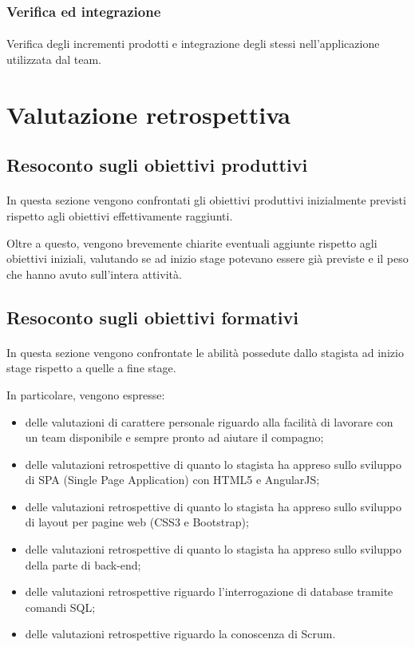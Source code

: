 \documentclass[
article,
10pt, %
oneside, %
BCOR5mm, %
]{scrartcl}
\begin{document}
\subsubsection{Verifica ed integrazione}
\paragraph{} Verifica degli incrementi prodotti e integrazione degli stessi
nell'applicazione utilizzata dal team.



\section{Valutazione retrospettiva} %

\subsection{Resoconto sugli obiettivi produttivi}
\paragraph{} In questa sezione vengono confrontati gli obiettivi produttivi
inizialmente previsti rispetto agli obiettivi effettivamente raggiunti.

Oltre a questo, vengono brevemente chiarite eventuali aggiunte rispetto agli
obiettivi iniziali, valutando se ad inizio stage potevano essere già previste
e il peso che hanno avuto sull'intera attività.

\subsection{Resoconto sugli obiettivi formativi}
\paragraph{} In questa sezione vengono confrontate le abilità possedute dallo
stagista ad inizio stage rispetto a quelle a fine stage.

In particolare, vengono espresse:

\begin{itemize}
\item delle valutazioni di carattere personale riguardo alla facilità di
  lavorare con un team disponibile e sempre pronto ad aiutare il compagno;
\item delle valutazioni retrospettive di quanto lo stagista ha appreso sullo
  sviluppo di SPA (Single Page Application) con HTML5 e AngularJS;
\item delle valutazioni retrospettive di quanto lo stagista ha appreso sullo
  sviluppo di layout per pagine web (CSS3 e Bootstrap);
\item delle valutazioni retrospettive di quanto lo stagista ha appreso sullo
  sviluppo della parte di back-end;
\item delle valutazioni retrospettive riguardo l'interrogazione di database
  tramite comandi SQL;
\item delle valutazioni retrospettive riguardo la conoscenza di Scrum.
\end{itemize}
\end{document}
